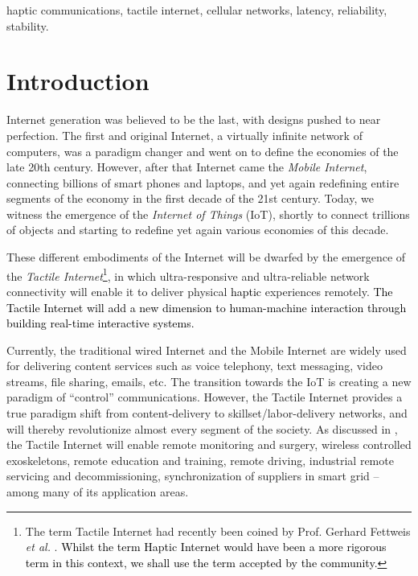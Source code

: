 \documentclass[journal]{IEEEtran}
\begin{document}
\begin{IEEEkeywords}
haptic communications, tactile internet, cellular networks, latency, reliability, stability.
\end{IEEEkeywords}






\IEEEpeerreviewmaketitle



\section{Introduction}
 Internet generation was believed to be the last, with designs pushed to near perfection. The first and original Internet, a virtually infinite network of computers, was a paradigm changer and went on to define the economies of the late 20th century.  However, after that Internet came the \emph{Mobile Internet}, connecting billions of smart phones and laptops, and yet again redefining entire segments of the economy in the first decade of the 21st century. Today, we witness the emergence of the \emph{Internet of Things} (IoT), shortly to connect trillions of objects and starting to redefine yet again various economies of this decade.

These different embodiments of the Internet will be dwarfed by the emergence of the \emph{Tactile Internet}\footnote{The term Tactile Internet had recently been coined by Prof. Gerhard Fettweis  \emph{et al.} \cite{TI}. \textcolor{black}{Whilst the term Haptic Internet would have been a more rigorous term in this context, we shall use the term accepted by the community.}}, in which ultra-responsive and ultra-reliable network connectivity will enable it to deliver physical   \textcolor{black}{ haptic} experiences remotely. \textcolor{black}{The Tactile Internet will add a new dimension to human-machine interaction through building real-time interactive systems.}



Currently, the traditional wired Internet and the Mobile Internet are widely used for delivering content services such as voice telephony, text messaging, video streams, file sharing, emails, etc. The transition towards the IoT is creating a new paradigm of ``control'' communications. However, the Tactile Internet provides a true paradigm shift from content-delivery to skillset/labor-delivery networks, and will thereby revolutionize almost every segment of the society. As discussed in \cite{TI}, the Tactile Internet will enable  remote monitoring and surgery, wireless controlled exoskeletons, remote education and training, remote driving, industrial remote servicing and decommissioning, synchronization of suppliers in smart grid -- among many of its application areas.
\end{document}
